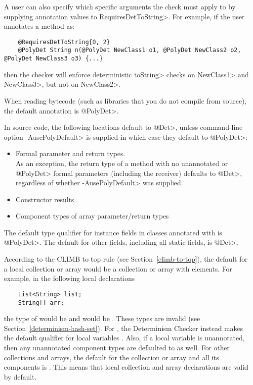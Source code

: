 A user can also specify which specific arguments the check must apply to by
supplying annotation values to \<RequiresDetToString>.
For example, if the user annotates a method as:
\begin{Verbatim}
    @RequiresDetToString{0, 2}
    @PolyDet String n(@PolyDet NewClass1 o1, @PolyDet NewClass2 o2, @PolyDet NewClass3 o3) {...}
\end{Verbatim}
then the checker will enforce deterministic \<toString> checks on \<NewClass1> and \<NewClass3>,
but not on \<NewClass2>.



When reading bytecode (such as libraries that you do not compile from
source), the default annotation is \<@PolyDet>.

In source code, the following locations default to
\<@Det>, unless command-line option \<-AusePolyDefault> is supplied in
which case they default to \<@PolyDet>:
\begin{itemize}
    \item Formal parameter and return types. \\
      As an exception, the return type of a method with no unannotated or
    \<@PolyDet> formal parameters (including the receiver) defaults to
    \<@Det>, regardless of whether \<-AusePolyDefault> was supplied.
    \item Constructor results
    \item Component types of array parameter/return types
\end{itemize}

The default type qualifier for instance fields in classes annotated with
 is \<@PolyDet>.
The default for other fields, including all static fields, is \<@Det>.


According to the CLIMB to top rule (see Section~\ref{climb-to-top}), the default
for a local collection or array would be a  collection or array
with  elements. For example, in the following local declarations
\begin{Verbatim}
    List<String> list;
    String[] arr;
\end{Verbatim}
the type of  would be  and
 would be . These types are invalid (see
Section~\ref{determinism-hash-set}). For , the Determinism Checker
instead makes the default qualifier for local variables . Also, if a local
 variable is unannotated, then any unannotated component types are
defaulted to  as well. For other collections and arrays, the default
for the collection or array and all its components is . This means
that local collection and array declarations are valid by default.

